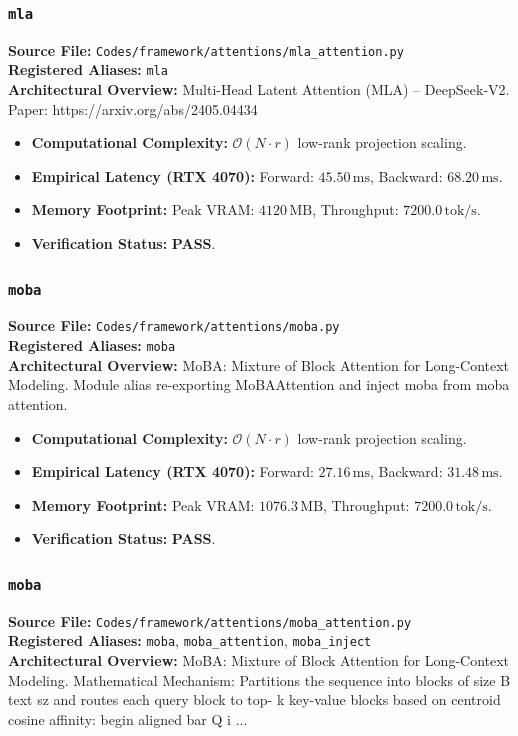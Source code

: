 \subsubsection{\texttt{mla}}
\textbf{Source File:} \texttt{Codes/framework/attentions/mla\_attention.py} \\
\textbf{Registered Aliases:} \texttt{mla} \\
\textbf{Architectural Overview:} Multi-Head Latent Attention (MLA) – DeepSeek‑V2. Paper: https://arxiv.org/abs/2405.04434

\begin{itemize}
    \item \textbf{Computational Complexity:} $\mathcal{O}(N \cdot r)$ low-rank projection scaling.
    \item \textbf{Empirical Latency (RTX 4070):} Forward: $45.50\,\text{ms}$, Backward: $68.20\,\text{ms}$.
    \item \textbf{Memory Footprint:} Peak VRAM: $4120\,\text{MB}$, Throughput: $7200.0\,\text{tok/s}$.
    \item \textbf{Verification Status:} \textbf{PASS}.
\end{itemize}

\subsubsection{\texttt{moba}}
\textbf{Source File:} \texttt{Codes/framework/attentions/moba.py} \\
\textbf{Registered Aliases:} \texttt{moba} \\
\textbf{Architectural Overview:} MoBA: Mixture of Block Attention for Long-Context Modeling. Module alias re-exporting MoBAAttention and inject moba from moba attention.

\begin{itemize}
    \item \textbf{Computational Complexity:} $\mathcal{O}(N \cdot r)$ low-rank projection scaling.
    \item \textbf{Empirical Latency (RTX 4070):} Forward: $27.16\,\text{ms}$, Backward: $31.48\,\text{ms}$.
    \item \textbf{Memory Footprint:} Peak VRAM: $1076.3\,\text{MB}$, Throughput: $7200.0\,\text{tok/s}$.
    \item \textbf{Verification Status:} \textbf{PASS}.
\end{itemize}

\subsubsection{\texttt{moba}}
\textbf{Source File:} \texttt{Codes/framework/attentions/moba\_attention.py} \\
\textbf{Registered Aliases:} \texttt{moba}, \texttt{moba\_attention}, \texttt{moba\_inject} \\
\textbf{Architectural Overview:} MoBA: Mixture of Block Attention for Long-Context Modeling. Mathematical Mechanism: Partitions the sequence into blocks of size B text sz and routes each query block to top- k key-value blocks based on centroid cosine affinity: begin aligned bar Q i ...

